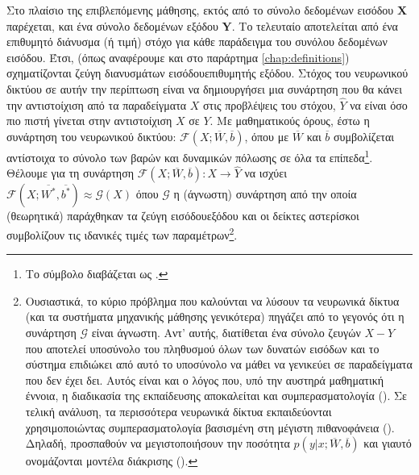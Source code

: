 Στο πλαίσιο της επιβλεπόμενης μάθησης, εκτός από το σύνολο δεδομένων εισόδου $\boldsymbol{X}$ παρέχεται, και ένα σύνολο δεδομένων εξόδου $\boldsymbol{Y}$. Το τελευταίο αποτελείται από ένα επιθυμητό διάνυσμα (ή τιμή) στόχο για κάθε παράδειγμα του συνόλου δεδομένων εισόδου. Έτσι, (όπως αναφέρουμε και στο παράρτημα \ref{chap:definitions}) σχηματίζονται ζεύγη διανυσμάτων εισόδου\textendash επιθυμητής εξόδου. Στόχος του νευρωνικού δικτύου σε αυτήν την περίπτωση είναι να δημιουργήσει μια συνάρτηση που θα κάνει την αντιστοίχιση από τα παραδείγματα $X$ στις προβλέψεις του στόχου, $\hat{Y}$ να είναι όσο πιο πιστή γίνεται στην αντιστοίχιση $X$ σε $Y$. Με μαθηματικούς όρους, έστω η συνάρτηση του νευρωνικού δικτύου: $\mathcal{F}(X;\overline{W},\overline{b})$, όπου με $\overline{W}$ και $\overline{b}$ συμβολίζεται αντίστοιχα το σύνολο των βαρών και δυναμικών πόλωσης σε όλα τα επίπεδα\footnote{Το σύμβολο \textquote{\en{;}} διαβάζεται ως .}. Θέλουμε για τη συνάρτηση $\mathcal{F}(X;\overline{W},\overline{b}):X \rightarrow \hat{Y}$ να ισχύει $\mathcal{F}(X;\overline{W^*},\overline{b^*}) \approx \mathcal{G}(X)$ όπου $\mathcal{G}$ η (άγνωστη) συνάρτηση από την οποία (θεωρητικά) παράχθηκαν τα ζεύγη εισόδου\textendash εξόδου και οι δείκτες αστερίσκοι συμβολίζουν τις ιδανικές τιμές των παραμέτρων\footnote{Ουσιαστικά, το κύριο πρόβλημα που καλούνται να λύσουν τα νευρωνικά δίκτυα (και τα συστήματα μηχανικής μάθησης γενικότερα) πηγάζει από το γεγονός ότι η συνάρτηση $\mathcal{G}$ είναι άγνωστη. Αντ' αυτής, διατίθεται ένα σύνολο ζευγών $X-Y$ που αποτελεί υποσύνολο του πληθυσμού όλων των δυνατών εισόδων και το σύστημα επιδιώκει από αυτό το υποσύνολο να μάθει να γενικεύει σε παραδείγματα που δεν έχει δει. Αυτός είναι και ο λόγος που, υπό την αυστηρά μαθηματική έννοια, η διαδικασία της εκπαίδευσης αποκαλείται και συμπερασματολογία (). Σε τελική ανάλυση, τα περισσότερα νευρωνικά δίκτυα εκπαιδεύονται χρησιμοποιώντας συμπερασματολογία βασισμένη στη μέγιστη πιθανοφάνεια ()\cite{goodfellow2016deep}. Δηλαδή, προσπαθούν να μεγιστοποιήσουν την ποσότητα $p(y|x;\overline{W},\overline{b})$ και γιαυτό ονομάζονται μοντέλα διάκρισης ().}.\par

